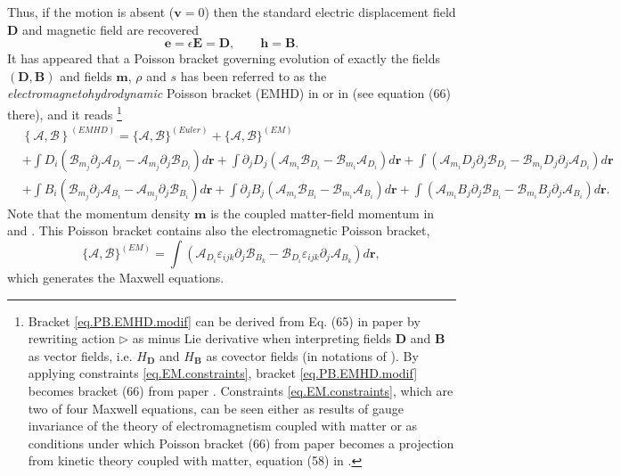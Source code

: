\documentclass[twoside]{article}
\newcommand{\rr}{{\boldsymbol{r}}}
\newcommand{\vv}{{\boldsymbol{v}}}
\newcommand{\mm}{{\boldsymbol{m}}}
\newcommand{\ee}{{\boldsymbol{e}}}
\newcommand{\hh}{{\boldsymbol{h}}}
\newcommand{\EE}{{\boldsymbol{E}}}
\newcommand{\DD}{{\boldsymbol{D}}}
\newcommand{\BB}{{\boldsymbol{B}}}
\newcommand{\AF}{\mathscr{A}}
\newcommand{\BF}{\mathscr{B}}
\newcommand{\pd}{\partial}
\newcommand{\eps}{\varepsilon}
\begin{document}
Thus, if the motion is absent ($ \vv = 0 $) then the standard electric 
displacement field $ \DD $ and 
magnetic field are recovered
\begin{equation}\label{eqn.DB}
\ee =  \epsilon \EE = \DD, \qquad  \hh = \BB .
\end{equation}
It has appeared that a Poisson bracket governing evolution of exactly the 
fields $ (\DD,\BB) $ and fields $ \mm 
$, $ \rho $ and $ s $ has been referred to as the 
\textit{electromagnetohydrodynamic} Poisson 
bracket (EMHD) in \cite{Holm-EMHD} or in \cite{elmag} (see equation (66) there), and it reads
\footnote{
Bracket \eqref{eq.PB.EMHD.modif} can be derived from Eq. (65) in paper 
\cite{elmag} by rewriting action $\rhd$ as minus Lie derivative when 
interpreting fields $\DD$ and $\BB$ as vector fields, i.e. $H_\DD$ and $H_\BB$ 
as covector fields (in notations of \cite{elmag}). By applying constraints 
\eqref{eq.EM.constraints}, bracket 
\eqref{eq.PB.EMHD.modif} becomes bracket (66) from paper \cite{elmag}. 
Constraints \eqref{eq.EM.constraints}, which are two of four Maxwell equations, 
can be seen either as results of gauge invariance of the theory of 
electromagnetism coupled with matter \cite{MaWe} or as conditions under which 
Poisson bracket (66) from paper \cite{elmag} becomes a projection from kinetic 
theory coupled with matter, equation (58) in \cite{elmag}.
}
\begin{align}\label{eq.PB.EMHD.modif}
&\left\{\AF,\BF\right\}^{(EMHD)}=\{\AF,\BF\}^{(Euler)} + 
\{\AF,\BF\}^{(EM)}  \nonumber\\
&+\int D_i(\BF_{m_j}\pd_j \AF_{D_i} -\AF_{m_j}\pd_j 
\BF_{D_i})d\rr
+\int \pd_jD_j (\AF_{m_i} \BF_{D_i} -\BF_{m_i} 
\AF_{D_i}) d\rr
+\int (\AF_{m_i} D_j \pd_j \BF_{D_i} - \BF_{m_i} D_j \pd_j 
\AF_{D_i}) d\rr \nonumber\\
&+\int B_i( \BF_{m_j}\pd_j \AF_{B_i} -\AF_{m_j}\pd_j 
\BF_{B_i}) d\rr 
+\int \pd_jB_j (\AF_{m_i} \BF_{B_i} -\BF_{m_i} 
\AF_{B_i}) d\rr
+\int (\AF_{m_i} B_j \pd_j \BF_{B_i} - \BF_{m_i} B_j\pd_j \AF_{B_i}) d\rr.
\end{align}
Note that the momentum density $ \mm $ is the coupled matter-field momentum 
in~\cite{elmag} and \cite{DPRZ2017}. This Poisson bracket contains also the 
electromagnetic 
Poisson bracket,
\begin{equation}
\{\AF,\BF\}^{(EM)} = \int (\AF_{D_i}\eps_{ijk}\pd_j 
\BF_{B_k}-\BF_{D_i}\eps_{ijk}\pd_j \AF_{B_k}) d\rr,
\end{equation}
which generates the Maxwell equations. 
\end{document}
